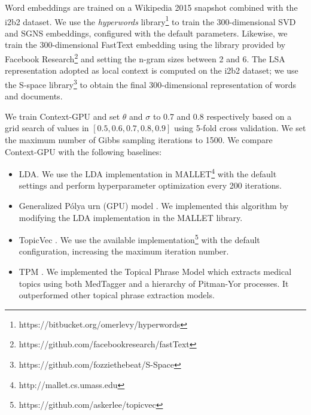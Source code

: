 \documentclass[letterpaper]{article}
\begin{document}
Word embeddings are trained on a Wikipedia 2015 snapshot combined with the i2b2 dataset. We use the \textit{hyperwords} library\footnote{https://bitbucket.org/omerlevy/hyperwords} \cite{Levy15} to train the 300-dimensional SVD and SGNS embeddings, configured with the default parameters. Likewise, we train the 300-dimensional FastText embedding using the library provided by Facebook Research\footnote{https://github.com/facebookresearch/fastText} and setting the n-gram sizes between 2 and 6.
The LSA representation adopted as local context is computed on the i2b2 dataset; we use the S-space library\footnote{https://github.com/fozziethebeat/S-Space} to obtain the final 300-dimensional representation of words and documents.

We train Context-GPU and set $\theta$ and $\sigma$ to 0.7 and 0.8 respectively based on a grid search of values in $[0.5, 0.6, 0.7, 0.8, 0.9]$ using 5-fold cross validation.  %
We set the maximum number of Gibbs sampling iterations to 1500. %
We compare Context-GPU with the following baselines:

\begin{itemize}
    \item LDA. We use the LDA implementation in  MALLET\footnote{http://mallet.cs.umass.edu} with the default settings and perform hyperparameter optimization every 200 iterations.
    \item Generalized P\'{o}lya urn (GPU) model \cite{Mimno11}. %
    We implemented this algorithm by modifying the LDA implementation in the MALLET library.
    \item TopicVec \cite{Li16}. %
    We use the available implementation\footnote{https://github.com/askerlee/topicvec} with the default configuration, increasing the maximum iteration number.
    \item TPM \cite{He16Med}. We implemented the Topical Phrase Model which extracts medical topics using both MedTagger and a hierarchy of Pitman-Yor processes. It outperformed other topical phrase extraction models. %
\end{itemize}
\end{document}
